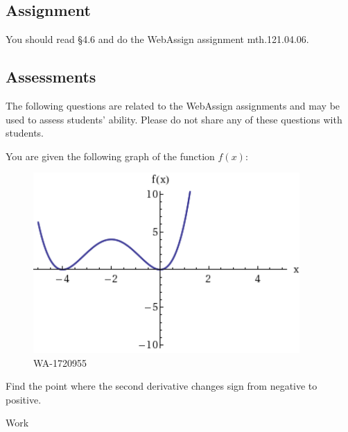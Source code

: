 \documentclass[12pt,addpoints, answers, fleqn]{exam}
\begin{document}
\subsection{Assignment}
You should read \S  4.6 and do the WebAssign assignment mth.121.04.06.
\vfill
\pagebreak
\begin{teacher}
\subsection{Assessments}
The following questions are related to the WebAssign assignments and may be used to assess students' ability. Please do not share any of these questions with students.
\begin{questions}		
\question 	%

You are given the following graph of the function $f\left(x\right)$:
\begin{figure}[htbp] %
   \centering
   \includegraphics[width=4in]{./graphics/1720955.pdf} 
   \caption{WA-1720955}
   \label{fig:1720955}
\end{figure}

Find the point where the second derivative changes sign from negative to positive.

\begin{solution}
Work
\end{solution}

\question 	%


\end{questions}
\end{teacher}
\end{document}
